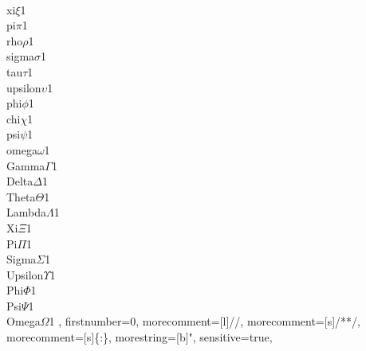 {        {\\xi}{$\xi$}1
        {\\pi}{$\pi$}1
        {\\rho}{$\rho$}1
        {\\sigma}{$\sigma$}1
        {\\tau}{$\tau$}1
        {\\upsilon}{$\upsilon$}1
        {\\phi}{$\phi$}1
        {\\chi}{$\chi$}1
        {\\psi}{$\psi$}1
        {\\omega}{$\omega$}1
        {\\Gamma}{$\Gamma$}1
        {\\Delta}{$\Delta$}1
        {\\Theta}{$\Theta$}1
        {\\Lambda}{$\Lambda$}1
        {\\Xi}{$\Xi$}1
        {\\Pi}{$\Pi$}1
        {\\Sigma}{$\Sigma$}1
        {\\Upsilon}{$\Upsilon$}1
        {\\Phi}{$\Phi$}1
        {\\Psi}{$\Psi$}1
        {\\Omega}{$\Omega$}1
    ,
    firstnumber=0,
    morecomment=[l]{//},
    morecomment=[s]{/*}{*/},
    morecomment=[s]{\{:}{\}},
    morestring=[b]",
    sensitive=true,  %
}
